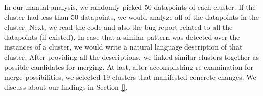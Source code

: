 In our manual analysis, we randomly picked 50 datapoints of each cluster. If the cluster had less than 50 datapoints, we would analyze all of the datapoints in the cluster. Next, we read the code and also the bug report related to all the datapoints (if existed). In case that a similar pattern was detected over the instances of a cluster, we would write a natural language description of that cluster. After providing all the descriptions, we linked similar clusters together as possible candidates for merging. At last, after accomplishing re-examination for merge possibilities, we selected 19 clusters that manifested concrete changes. We discuss about our findings in Section \ref{}.





